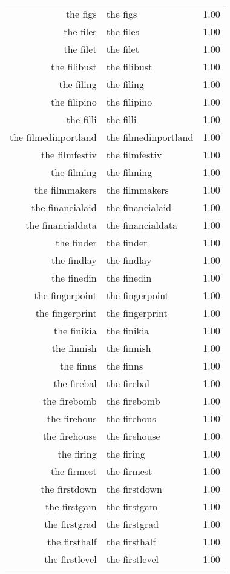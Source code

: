 \begin{table}[ht]
\begin{tabular}{rlr}
  the figs & the figs & 1.00 \\ 
  the files & the files & 1.00 \\ 
  the filet & the filet & 1.00 \\ 
  the filibust & the filibust & 1.00 \\ 
  the filing & the filing & 1.00 \\ 
  the filipino & the filipino & 1.00 \\ 
  the filli & the filli & 1.00 \\ 
  the filmedinportland & the filmedinportland & 1.00 \\ 
  the filmfestiv & the filmfestiv & 1.00 \\ 
  the filming & the filming & 1.00 \\ 
  the filmmakers & the filmmakers & 1.00 \\ 
  the financialaid & the financialaid & 1.00 \\ 
  the financialdata & the financialdata & 1.00 \\ 
  the finder & the finder & 1.00 \\ 
  the findlay & the findlay & 1.00 \\ 
  the finedin & the finedin & 1.00 \\ 
  the fingerpoint & the fingerpoint & 1.00 \\ 
  the fingerprint & the fingerprint & 1.00 \\ 
  the finikia & the finikia & 1.00 \\ 
  the finnish & the finnish & 1.00 \\ 
  the finns & the finns & 1.00 \\ 
  the firebal & the firebal & 1.00 \\ 
  the firebomb & the firebomb & 1.00 \\ 
  the firehous & the firehous & 1.00 \\ 
  the firehouse & the firehouse & 1.00 \\ 
  the firing & the firing & 1.00 \\ 
  the firmest & the firmest & 1.00 \\ 
  the firstdown & the firstdown & 1.00 \\ 
  the firstgam & the firstgam & 1.00 \\ 
  the firstgrad & the firstgrad & 1.00 \\ 
  the firsthalf & the firsthalf & 1.00 \\ 
  the firstlevel & the firstlevel & 1.00 \\ 

\end{tabular}
\end{table}
